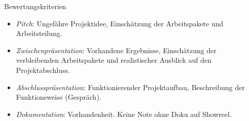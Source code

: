 \begin{frame}{Bewertungskriterien}
\begin{itemize}
\item \emph{Pitch}: Ungefähre Projektidee, Einschätzung der Arbeitspakete und Arbeitsteilung.
\item \emph{Zwischenpräsentation}: Vorhandene Ergebnisse, Einschätzung der verbleibenden Arbeitspakete und realistischer Ausblick auf den Projektabschluss.
\item \emph{Abschlusspräsentation}: Funktionierender Projektaufbau, Beschreibung der Funktionsweise (Gespräch).
\item \emph{Dokumentation}: Vorhandenheit. Keine Note ohne Doku auf Showreel.
\end{itemize}




\end{frame}
